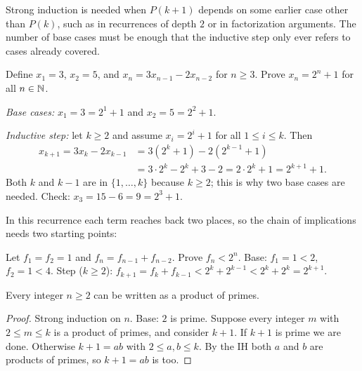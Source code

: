 Strong induction is needed when $P(k+1)$ depends on some earlier case other than $P(k)$, such
as in recurrences of depth $2$ or in factorization arguments. The number of base cases must be
enough that the inductive step only ever refers to cases already covered.

\begin{example}[Recurrence]
Define $x_1 = 3$, $x_2 = 5$, and $x_n = 3x_{n-1} - 2x_{n-2}$ for $n \ge 3$. Prove
$x_n = 2^n + 1$ for all $n \in \mathbb{N}$.

\emph{Base cases:} $x_1 = 3 = 2^1 + 1$ and $x_2 = 5 = 2^2 + 1$.

\emph{Inductive step:} let $k \ge 2$ and assume $x_i = 2^i + 1$ for all $1 \le i \le k$. Then
\begin{align*}
x_{k+1} = 3x_k - 2x_{k-1} &= 3(2^k + 1) - 2(2^{k-1} + 1) \\
&= 3\cdot 2^k - 2^k + 3 - 2 = 2\cdot 2^k + 1 = 2^{k+1}+1.
\end{align*}
Both $k$ and $k-1$ are in $\{1,\dots,k\}$ because $k \ge 2$; this is why two base cases are
needed. Check: $x_3 = 15 - 6 = 9 = 2^3 + 1$.
\end{example}

In this recurrence each term reaches back two places, so the chain of implications
needs two starting points:
\begin{center}
\end{center}

\begin{example}
Let $f_1 = f_2 = 1$ and $f_n = f_{n-1} + f_{n-2}$. Prove $f_n < 2^n$.
Base: $f_1 = 1 < 2$, $f_2 = 1 < 4$. Step ($k \ge 2$): $f_{k+1} = f_k + f_{k-1} < 2^k + 2^{k-1}
< 2^k + 2^k = 2^{k+1}$.
\end{example}

\begin{proposition}
Every integer $n \ge 2$ can be written as a product of primes.
\end{proposition}
\begin{proof}
Strong induction on $n$. Base: $2$ is prime. Suppose every integer $m$ with $2 \le m \le k$
is a product of primes, and consider $k+1$. If $k + 1$ is prime we are done. Otherwise
$k + 1 = ab$ with $2 \le a, b \le k$. By the IH both $a$ and $b$ are products of primes, so
$k+1 = ab$ is too.
\end{proof}

